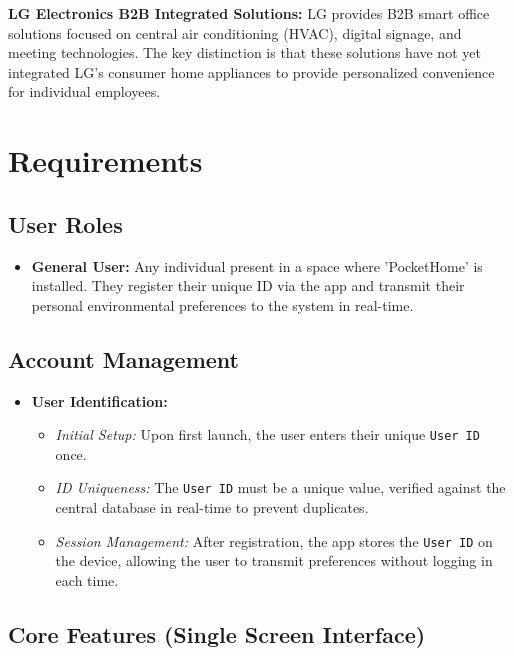 \documentclass[conference]{IEEEtran}
\begin{document}
\vspace{\baselineskip}

    \textbf{LG Electronics B2B Integrated Solutions:} LG provides B2B smart office solutions focused on central air conditioning (HVAC), digital signage, and meeting technologies. The key distinction is that these solutions have not yet integrated LG's consumer home appliances to provide personalized convenience for individual employees.


\section{Requirements}

\subsection{User Roles}
\begin{itemize}
    \item \textbf{General User:} Any individual present in a space where 'PocketHome' is installed. They register their unique ID via the app and transmit their personal environmental preferences to the system in real-time.
\end{itemize}

\subsection{Account Management}
\begin{itemize}
    \item \textbf{User Identification:}
        \begin{itemize}
            \item \textit{Initial Setup:} Upon first launch, the user enters their unique \texttt{User ID} once.
            \item \textit{ID Uniqueness:} The \texttt{User ID} must be a unique value, verified against the central database in real-time to prevent duplicates.
            \item \textit{Session Management:} After registration, the app stores the \texttt{User ID} on the device, allowing the user to transmit preferences without logging in each time.
        \end{itemize}
\end{itemize}

\subsection{Core Features (Single Screen Interface)}
\end{document}
